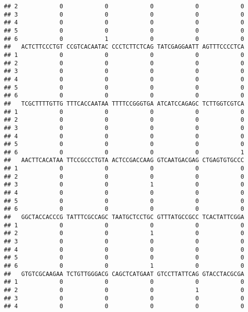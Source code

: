 \documentclass[]{article}
\begin{document}
\begin{verbatim}
## 2            0            0            0            0            0
## 3            0            0            0            0            0
## 4            0            0            0            0            0
## 5            0            0            0            0            0
## 6            0            1            0            0            0
##   ACTCTTCCCTGT CCGTCACAATAC CCCTCTTCTCAG TATCGAGGAATT AGTTTCCCCTCA
## 1            0            0            0            0            0
## 2            0            0            0            0            0
## 3            0            0            0            0            0
## 4            0            0            0            0            0
## 5            0            0            0            0            0
## 6            0            0            0            0            0
##   TCGCTTTTGTTG TTTCACCAATAA TTTTCCGGGTGA ATCATCCAGAGC TCTTGGTCGTCA
## 1            0            0            0            0            0
## 2            0            0            0            0            0
## 3            0            0            0            0            0
## 4            0            0            0            0            0
## 5            0            0            0            0            0
## 6            0            0            0            0            1
##   AACTTCACATAA TTCCGCCCTGTA ACTCCGACCAAG GTCAATGACGAG CTGAGTGTGCCC
## 1            0            0            0            0            0
## 2            0            0            0            0            0
## 3            0            0            1            0            0
## 4            0            0            0            0            0
## 5            0            0            0            0            0
## 6            0            0            0            0            0
##   GGCTACCACCCG TATTTCGCCAGC TAATGCTCCTGC GTTTATGCCGCC TCACTATTCGGA
## 1            0            0            0            0            0
## 2            0            0            1            0            0
## 3            0            0            0            0            0
## 4            0            0            0            0            0
## 5            0            0            0            0            0
## 6            0            0            1            0            0
##   GTGTCGCAAGAA TCTGTTGGGACG CAGCTCATGAAT GTCCTTATTCAG GTACCTACGCGA
## 1            0            0            0            0            0
## 2            0            0            0            1            0
## 3            0            0            0            0            0
## 4            0            0            0            0            0

\end{verbatim}
\end{document}

